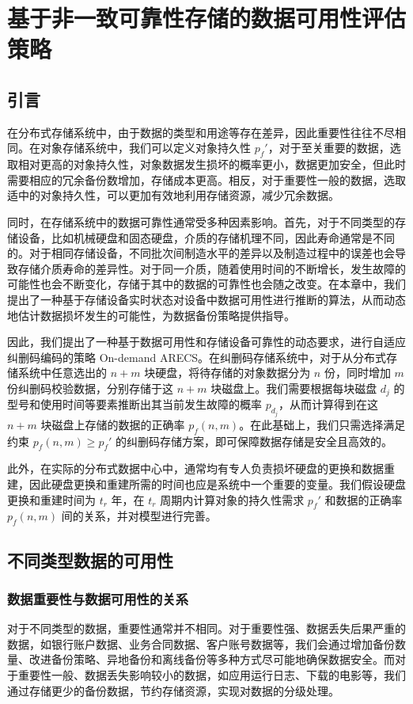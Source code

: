 \chapter{基于非一致可靠性存储的数据可用性评估策略}
\section{引言}
在分布式存储系统中，由于数据的类型和用途等存在差异，因此重要性往往不尽相同。在对象存储系统中，我们可以定义对象持久性 $p_{f}'$，对于至关重要的数据，选取相对更高的对象持久性，对象数据发生损坏的概率更小，数据更加安全，但此时需要相应的冗余备份数增加，存储成本更高。相反，对于重要性一般的数据，选取适中的对象持久性，可以更加有效地利用存储资源，减少冗余数据。

同时，在存储系统中的数据可靠性通常受多种因素影响。首先，对于不同类型的存储设备，比如机械硬盘和固态硬盘，介质的存储机理不同，因此寿命通常是不同的。对于相同存储设备，不同批次间制造水平的差异以及制造过程中的误差也会导致存储介质寿命的差异性。对于同一介质，随着使用时间的不断增长，发生故障的可能性也会不断变化，存储于其中的数据的可靠性也会随之改变。在本章中，我们提出了一种基于存储设备实时状态对设备中数据可用性进行推断的算法，从而动态地估计数据损坏发生的可能性，为数据备份策略提供指导。

因此，我们提出了一种基于数据可用性和存储设备可靠性的动态要求，进行自适应纠删码编码的策略 On-demand ARECS。在纠删码存储系统中，对于从分布式存储系统中任意选出的 $n+m$ 块硬盘，将待存储的对象数据分为 $n$ 份，同时增加 $m$ 份纠删码校验数据，分别存储于这 $n+m$ 块磁盘上。我们需要根据每块磁盘 $d_j$ 的型号和使用时间等要素推断出其当前发生故障的概率 $p_{d_j}$，从而计算得到在这 $n+m$ 块磁盘上存储的数据的正确率 $p_{f}(n,m)$。在此基础上，我们只需选择满足约束 $p_{f}(n,m) \geq p_{f}'$ 的纠删码存储方案，即可保障数据存储是安全且高效的。

此外，在实际的分布式数据中心中，通常均有专人负责损坏硬盘的更换和数据重建，因此硬盘更换和重建所需的时间也应是系统中一个重要的变量。我们假设硬盘更换和重建时间为 $t_r$ 年，在 $t_r$ 周期内计算对象的持久性需求 $p_{f}'$ 和数据的正确率 $p_{f}(n,m)$ 间的关系，并对模型进行完善。
\section{不同类型数据的可用性}
\subsection{数据重要性与数据可用性的关系}
对于不同类型的数据，重要性通常并不相同\cite{andronikou2012dynamic}。对于重要性强、数据丢失后果严重的数据，如银行账户数据、业务合同数据、客户账号数据等，我们会通过增加备份数量、改进备份策略、异地备份和离线备份等多种方式尽可能地确保数据安全。而对于重要性一般、数据丢失影响较小的数据，如应用运行日志、下载的电影等，我们通过存储更少的备份数据，节约存储资源，实现对数据的分级处理。
